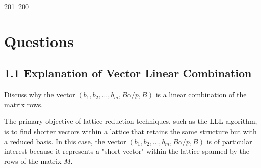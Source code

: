 201~200~\documentclass{article}
\begin{document}
	                                                                        	                                                \section{Questions}
	                                                                        	                                                \subsection{1.1 Explanation of Vector Linear Combination}

	                                                                        	                                                Discuss why the vector \((b_1, b_2, \ldots, b_m, B\alpha/p, B)\) is a linear combination of the matrix rows.

	                                                                        	                                                The primary objective of lattice reduction techniques, such as the LLL algorithm, is to find shorter vectors within a lattice that retains the same structure but with a reduced basis. In this case, the vector \((b_1, b_2, \ldots, b_m, B\alpha/p, B)\) is of particular interest because it represents a "short vector" within the lattice spanned by the rows of the matrix \(M\).
\end{document}
